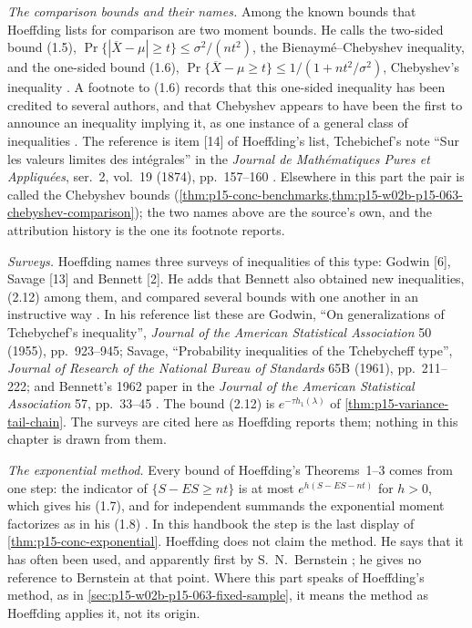 \emph{The comparison bounds and their names.} Among the known bounds
that Hoeffding lists for comparison are two moment bounds. He calls the two-sided bound (1.5),
\(\Pr\{|\overline X-\mu|\geq t\}\leq\sigma^2/(nt^2)\), the
Bienaym\'e--Chebyshev inequality, and the one-sided bound (1.6),
\(\Pr\{\overline X-\mu\geq t\}\leq1/(1+nt^2/\sigma^2)\), Chebyshev's
inequality \cite[p.~13]{Hoeffding1963BoundedSums}. A footnote to (1.6)
records that this one-sided inequality has been credited to several
authors, and that Chebyshev appears to have been the first to announce
an inequality implying it, as one instance of a general class of
inequalities \cite[p.~13 n.~2]{Hoeffding1963BoundedSums}. The
reference is item [14] of Hoeffding's list, Tchebichef's note ``Sur les
valeurs limites des int\'egrales'' in the \emph{Journal de
Math\'ematiques Pures et Appliqu\'ees}, ser.~2, vol.~19 (1874),
pp.~157--160 \cite[p.~30]{Hoeffding1963BoundedSums}. Elsewhere in this
part the pair is called the Chebyshev bounds
(\cref{thm:p15-conc-benchmarks,thm:p15-w02b-p15-063-chebyshev-comparison});
the two names above are the source's own, and the attribution history is
the one its footnote reports.

\emph{Surveys.} Hoeffding names three surveys of inequalities of this
type: Godwin [6], Savage [13] and Bennett [2]. He adds that Bennett also
obtained new inequalities, (2.12) among them, and compared
several bounds with one another in an instructive way \cite[p.~14]{Hoeffding1963BoundedSums}.
In his reference list these are Godwin, ``On generalizations of
Tchebychef's inequality'', \emph{Journal of the American Statistical
Association} 50 (1955), pp.~923--945; Savage, ``Probability inequalities
of the Tchebycheff type'', \emph{Journal of Research of the National
Bureau of Standards} 65B (1961), pp.~211--222; and Bennett's 1962 paper
in the \emph{Journal of the American Statistical Association} 57,
pp.~33--45 \cite[pp.~29--30]{Hoeffding1963BoundedSums}. The bound (2.12)
is \(e^{-\tau h_1(\lambda)}\) of \cref{thm:p15-variance-tail-chain}. The
surveys are cited here as Hoeffding reports them; nothing in this chapter
is drawn from them.

\emph{The exponential method.} Every bound of Hoeffding's Theorems~1--3
comes from one step: the indicator of \(\{S-ES\geq nt\}\) is at most
\(e^{h(S-ES-nt)}\) for \(h>0\), which gives his (1.7), and for independent
summands the exponential moment factorizes as in his (1.8)
\cite[p.~14]{Hoeffding1963BoundedSums}. In this handbook the step is the
last display of \cref{thm:p15-conc-exponential}. Hoeffding does not
claim the method. He says that it has often been used, and apparently
first by S.~N.~Bernstein \cite[p.~14]{Hoeffding1963BoundedSums}; he gives
no reference to Bernstein at that point. Where this part speaks of
Hoeffding's method, as in \cref{sec:p15-w02b-p15-063-fixed-sample}, it
means the method as Hoeffding applies it, not its origin.

